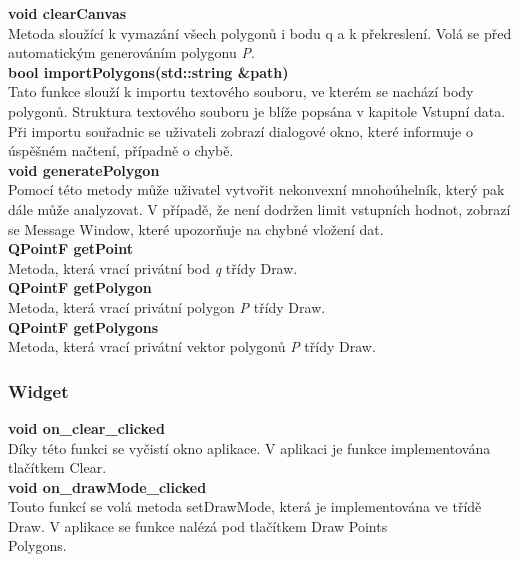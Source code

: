 \documentclass[a4paper,11pt,twoside]{article}
\begin{document}
\noindent\textbf{void clearCanvas}\\
Metoda sloužící k vymazání všech polygonů i bodu q a k překreslení. Volá se před automatickým generováním polygonu \textit{P}. \\

\noindent\textbf{bool importPolygons(std::string \&path)}\\
Tato funkce slouží k importu textového souboru, ve kterém se nachází body polygonů. Struktura textového souboru je blíže popsána v kapitole Vstupní data. Při importu souřadnic se uživateli zobrazí dialogové okno, které informuje o úspěšném načtení, případně o chybě.\\

\newpage
\vspace*{-1cm}
\noindent\textbf{void generatePolygon}\\
Pomocí této metody může uživatel vytvořit nekonvexní mnohoúhelník, který pak dále může analyzovat. V případě, že není dodržen limit vstupních hodnot, zobrazí se Message Window, které upozorňuje na chybné vložení dat.\\

\noindent\textbf{QPointF getPoint}\\
Metoda, která vrací privátní bod \textit{q} třídy Draw.\\

\noindent\textbf{QPointF getPolygon}\\
Metoda, která vrací privátní polygon \textit{P} třídy Draw.\\

\noindent\textbf{QPointF getPolygons}\\
Metoda, která vrací privátní vektor polygonů \textit{P} třídy Draw.

\subsubsection{Widget}
\noindent\textbf{void on\_clear\_clicked}\\
Díky této funkci se vyčistí okno aplikace.  V aplikaci je funkce implementována tlačítkem Clear.\\

\noindent\textbf{void on\_drawMode\_clicked}\\
Touto funkcí se volá metoda setDrawMode, která je implementována ve třídě Draw. V aplikace se funkce nalézá pod tlačítkem Draw Points\\Polygons. \\
\end{document}
